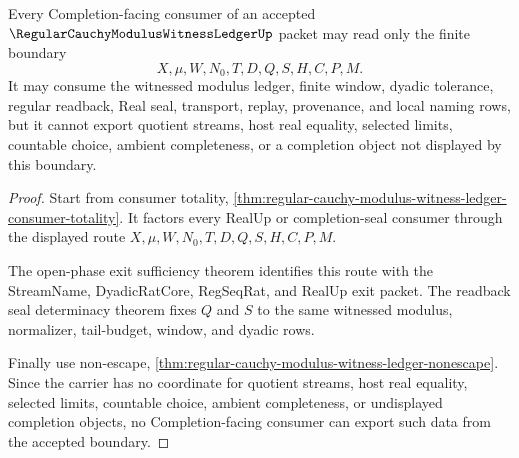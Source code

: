 \begin{theorem}
\label{thm:regular-cauchy-modulus-witness-ledger-completion-boundary}
Every Completion-facing consumer of an accepted $\RegularCauchyModulusWitnessLedgerUp$ packet may read only the finite boundary
$$
X,\mu,W,N_0,T,D,Q,S,H,C,P,M.
$$
It may consume the witnessed modulus ledger, finite window, dyadic tolerance, regular readback, Real seal, transport, replay, provenance, and local naming rows, but it cannot export quotient streams, host real equality, selected limits, countable choice, ambient completeness, or a completion object not displayed by this boundary.
\end{theorem}
\begin{proof}
Start from consumer totality, \autoref{thm:regular-cauchy-modulus-witness-ledger-consumer-totality}. It factors every RealUp or completion-seal consumer through the displayed route $X,\mu,W,N_0,T,D,Q,S,H,C,P,M$.

The open-phase exit sufficiency theorem identifies this route with the StreamName, DyadicRatCore, RegSeqRat, and RealUp exit packet. The readback seal determinacy theorem fixes $Q$ and $S$ to the same witnessed modulus, normalizer, tail-budget, window, and dyadic rows.

Finally use non-escape, \autoref{thm:regular-cauchy-modulus-witness-ledger-nonescape}. Since the carrier has no coordinate for quotient streams, host real equality, selected limits, countable choice, ambient completeness, or undisplayed completion objects, no Completion-facing consumer can export such data from the accepted boundary.
\end{proof}

